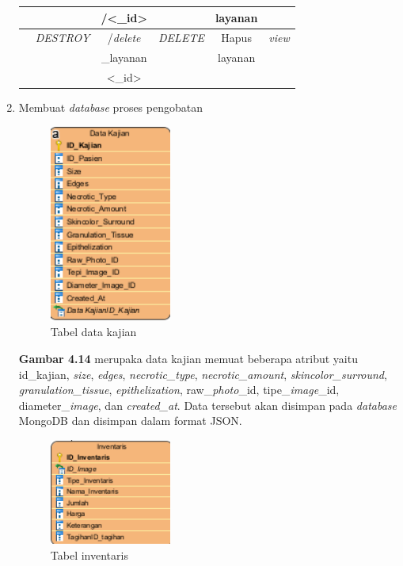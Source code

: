 \begin{enumerate}
\begin{table}[H]
\begin{tabular}{|c|c|c|c|c|c|}
			& 
			&
			/<\_id>&
			&
			layanan&
			\\
			\hline
			
			& 
			\emph{DESTROY} &
			/\emph{delete}&
			\emph{DELETE} &
			Hapus&
			\emph{view}\\
			
			& 
			&
			\_layanan&
			&
			layanan &
			\\
			
			& 
			&
			<\_id>&
			&
			&
			\\
			\hline
			
		\end{tabular}
	\end{table}
	
	\item Membuat \emph{database} proses pengobatan
	
	\begin{figure}[H]
		\centering
		\includegraphics[width=4cm]{gambar/data_kajian_database.png}
		\caption{Tabel data kajian}
		\label{Gambar:pengelolaanantrian2}
	\end{figure}

	\textbf{Gambar 4.14} merupaka data kajian memuat beberapa atribut yaitu id\_kajian, \emph{size}, \emph{edges}, \emph{necrotic\_type}, \emph{necrotic\_amount}, \emph{skincolor\_surround}, \emph{granulation\_tissue}, \emph{epithelization}, raw\_\emph{photo}\_id, tipe\_\emph{image}\_id, diameter\_\emph{image}, dan \emph{created\_at}. Data tersebut akan disimpan pada \emph{database} MongoDB dan disimpan dalam format JSON.
	
	\begin{figure}[H]
		\centering
		\includegraphics[width=4cm]{gambar/inventaris_database.png}
		\caption{Tabel inventaris}
		\label{Gambar:pengelolaanantrian2}
	\end{figure}


\end{enumerate}

